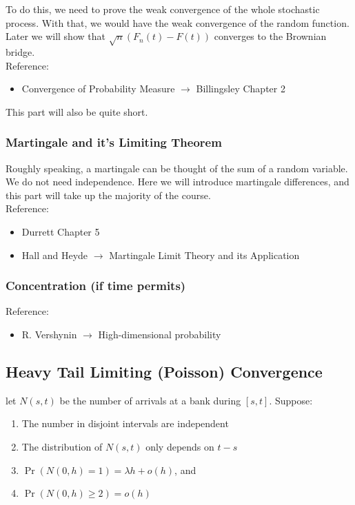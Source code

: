 \documentclass[../main/main.tex]{subfiles}
\begin{document}
To do this, we need to prove the weak convergence of the whole stochastic process. With that, we would have the weak convergence of the random function. Later we will show that \(\sqrt{n}(F_n(t)-F(t))\) converges to the Brownian bridge.\\

Reference:
\begin{itemize}
	\item Convergence of Probability Measure \(\to\) Billingsley Chapter 2
\end{itemize}

This part will also be quite short.


\subsubsection{Martingale and it's Limiting Theorem}

Roughly speaking, a martingale can be thought of the sum of a random variable. We do not need independence. Here we will introduce martingale differences, and this part will take up the majority of the course.\\

Reference:
\begin{itemize}
	\item Durrett Chapter 5
	\item Hall and Heyde \(\to\) Martingale Limit Theory and its Application
\end{itemize}

\subsubsection{Concentration (if time permits)}


Reference:
\begin{itemize}
	\item R. Vershynin \(\to\) High-dimensional probability
\end{itemize}


\subsection{Heavy Tail Limiting (Poisson) Convergence}

let $N(s,t)$ be the number of arrivals at a bank during $[s,t]$. Suppose:

\begin{enumerate}[label=(\roman*)]
	\item  The number in disjoint intervals are independent
	\item The distribution of $N(s,t)$ only depends on $t-s$
	\item $\Pr(N(0,h)=1) = \lambda h + o(h)$, and
	\item $\Pr(N(0,h)\geq 2) = o(h)$
\end{enumerate}
\end{document}
